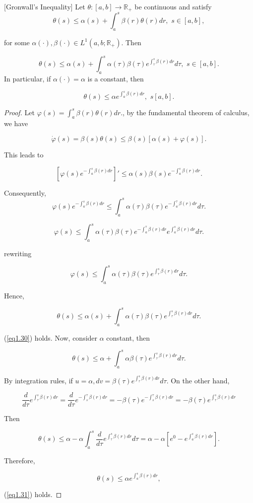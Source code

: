 \begin{prop}\label{GIP}[Gronwall's Inequality]
	Let $\theta:[a,b]\rightarrow \mathbb{R}_{+}$ be continuous and satisfy
	$$\theta (s)\leq \alpha(s)+\int_a^s\beta(r)\theta (r) dr,\,\, s\in [a,b],$$
	
	for some $\alpha(\cdot),\beta (\cdot)\in L^1(a,b;\mathbb{R}_{+})$. Then
	
	\begin{equation}\label{eq1.30}
	\theta(s)\leq \alpha(s)+\int_{a}^{s}\alpha(\tau)\beta(\tau)e^{\int_{\tau}^{s}\beta(r)dr}d\tau,\,\, s\in[a,b].
	\end{equation}
	In particular, if $\alpha(\cdot)=\alpha$ is a constant, then
	
	\begin{equation}\label{eq1.31}
	\theta(s) \leq \alpha e^{\int_{a}^{s}\beta(r)dr},\,\, s[a,b]. 
	\end{equation}
	\end{prop}
\begin{proof}
	Let $\varphi(s)=\int_{a}^{s}\beta(r)\theta(r)dr.$, by the fundamental theorem of calculus, we have
		
	$$\dot{\varphi}(s)=\beta(s)\theta(s)\leq \beta(s)[\alpha(s)+\varphi(s)].$$
	
	This leads to 
	
	$$[\varphi(s)e^{-\int_{a}^{s}\beta(r)dr}]'\leq\alpha(s)\beta(s)e^{-\int_{a}^{s}\beta(r)dr}.$$
	
	Consequently,
	$$\varphi(s)e^{-\int_{a}^{s}\beta(r)dr}\leq \int_{a}^{s}\alpha(\tau)\beta(\tau)e^{-\int_{a}^{\tau}\beta(r)dr}d\tau.$$
	
		$$\varphi(s)\leq \int_{a}^{s}\alpha(\tau)\beta(\tau)e^{-\int_{a}^{\tau}\beta(r)dr}e^{\int_{a}^{s}\beta(r)dr}d\tau .$$
	
	rewriting 
	
	$$\varphi(s)\leq \int_{a}^{s}\alpha(\tau)\beta(\tau)e^{\int_{\tau}^{s}\beta(r)dr}d\tau .$$
	
	Hence,
	
	$$\theta(s)\leq \alpha(s)+\int_{a}^{s}\alpha(\tau)\beta(\tau)e^{\int_{\tau}^{s}\beta(r)dr}d\tau.$$
	
	(\ref{eq1.30}) holds. Now, consider $\alpha$ constant, then
	
	$$\theta(s)\leq \alpha+\int_{a}^{s}\alpha\beta(\tau)e^{\int_{\tau}^{s}\beta(r)dr}d\tau.$$
	
	By integration rules, if $u=\alpha,dv=\beta(\tau)e^{\int_{\tau}^{s}\beta(r)dr}d\tau$. On the other hand,
	
	$$\frac{d}{d\tau}e^{\int_{\tau}^{s}\beta(r)dr}=\frac{d}{d\tau}e^{-\int_{s}^{\tau}\beta(r)dr}=-\beta(\tau) e^{-\int_{s}^{\tau} \beta(r)dr}=-\beta(\tau)e^{\int_{\tau}^{s}\beta(r)dr}$$
	
	Then
	
	$$\theta(s)\leq \alpha-\alpha\int_{a}^{s}\frac{d}{d\tau}e^{\int_{\tau}^{s}\beta(r)dr}d\tau=\alpha-\alpha [e^{0}-e^{\int_{a}^{s}\beta(r)dr}].$$
	
	Therefore,
	
	$$\theta(s)\leq \alpha e^{\int_{a}^{s}\beta(r)dr},$$
	
	(\ref{eq1.31}) holds.
\end{proof}

